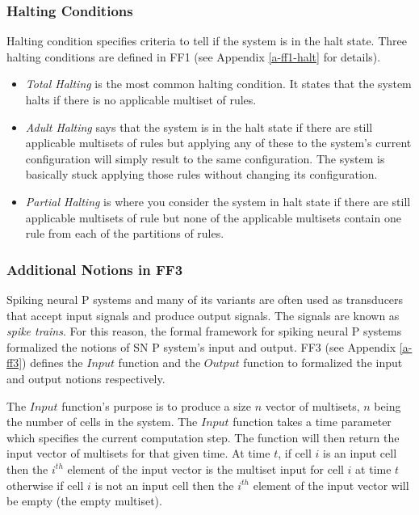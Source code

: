 \documentclass{article}
\begin{document}

\subsubsection{Halting Conditions}

Halting condition specifies criteria to tell if the system is in the halt state. Three halting 
conditions are defined in FF1 (see Appendix \ref{a-ff1-halt} for details).

\begin{itemize}
\item \emph{Total Halting} is the most common halting condition. It states that the system halts if
       there is no applicable multiset of rules. 
\item \emph{Adult Halting} says that the system is in the halt state if there are still applicable 
      multisets of rules but applying any of these to the system's current configuration will 
      simply result to the same configuration. The system is basically stuck applying those rules 
      without changing its configuration.
\item \emph{Partial Halting} is where you consider the system in halt state if there are still
      applicable multisets of rule but none of the applicable multisets contain one rule from each
      of the partitions of rules.
\end{itemize}


\subsubsection{Additional Notions in FF3}

Spiking neural P systems and many of its variants are often used as transducers that accept input
signals and produce output signals. The signals are known as \emph{spike trains}. For this reason, 
the formal framework for spiking neural P systems formalized the notions of SN P system's input and 
output. FF3 (see Appendix \ref{a-ff3}) defines the $Input$ function and the $Output$ function to 
formalized the input and output notions respectively.

The $Input$ function's purpose is to produce a size $n$ vector of multisets, $n$ being the number of
cells in the system. The $Input$ function takes a time parameter which specifies the current 
computation step. The function will then return the input vector of multisets for that given time. 
At time $t$, if cell $i$ is an input cell then the $i^{th}$ element of the input vector is the 
multiset input for cell $i$ at time $t$ otherwise if cell $i$ is not an input cell then the $i^{th}$ 
element of the input vector will be empty (the empty multiset).
\end{document}
